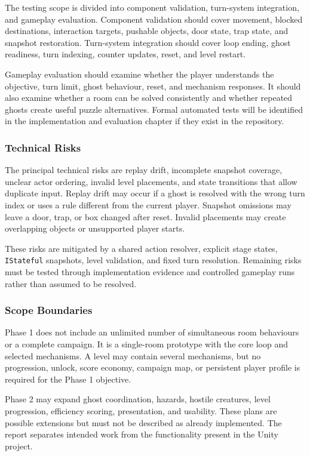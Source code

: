 The testing scope is divided into component validation, turn-system integration, and gameplay evaluation. Component validation should cover movement, blocked destinations, interaction targets, pushable objects, door state, trap state, and snapshot restoration. Turn-system integration should cover loop ending, ghost readiness, turn indexing, counter updates, reset, and level restart.

Gameplay evaluation should examine whether the player understands the objective, turn limit, ghost behaviour, reset, and mechanism responses. It should also examine whether a room can be solved consistently and whether repeated ghosts create useful puzzle alternatives. Formal automated tests will be identified in the implementation and evaluation chapter if they exist in the repository.

\subsubsection{Technical Risks}

The principal technical risks are replay drift, incomplete snapshot coverage, unclear actor ordering, invalid level placements, and state transitions that allow duplicate input. Replay drift may occur if a ghost is resolved with the wrong turn index or uses a rule different from the current player. Snapshot omissions may leave a door, trap, or box changed after reset. Invalid placements may create overlapping objects or unsupported player starts.

These risks are mitigated by a shared action resolver, explicit stage states, \texttt{IStateful} snapshots, level validation, and fixed turn resolution. Remaining risks must be tested through implementation evidence and controlled gameplay runs rather than assumed to be resolved.

\subsubsection{Scope Boundaries}

Phase 1 does not include an unlimited number of simultaneous room behaviours or a complete campaign. It is a single-room prototype with the core loop and selected mechanisms. A level may contain several mechanisms, but no progression, unlock, score economy, campaign map, or persistent player profile is required for the Phase 1 objective.

Phase 2 may expand ghost coordination, hazards, hostile creatures, level progression, efficiency scoring, presentation, and usability. These plans are possible extensions but must not be described as already implemented. The report separates intended work from the functionality present in the Unity project.


